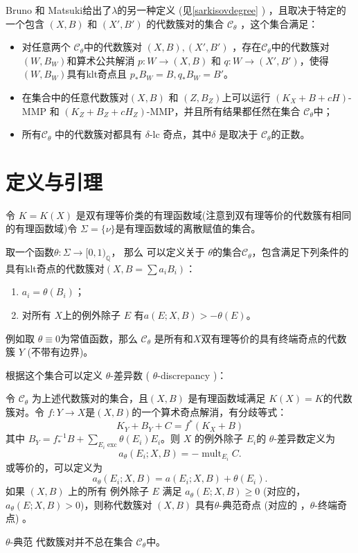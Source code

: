 Bruno 和 Matsuki给出了$\lambda$的另一种定义 (见\ref{sarkisovdegree} ) ，且取决于特定的一个包含 $(X,B)$ 和 $(X',B')$ 的代数簇对的集合 $\mathcal{C}_{\theta}$ ，这个集合满足：
\begin{itemize}
  \item
   对任意两个  $\mathcal{C}_{\theta}$中的代数簇对 $(X,B),(X',B')$ ，存在$\mathcal{C}_\theta$中的代数簇对 $(W,B_W)$和算术公共解消 $p:W\to (X,B)$ 和 $q:W\to (X',B')$，使得 $(W,B_W)$具有klt奇点且 $p_*B_W=B,q_*B_W=B'$。
  \item  在集合中的任意代数簇对$(X,B)$ 和 $(Z,B_Z)$上可以运行  $(K_X+B+cH)$-MMP 和 $(K_Z+B_Z+cH_Z)$-MMP，并且所有结果都任然在集合 $\mathcal{C}_{\theta}$中；
  \item 所有$\mathcal{C}_{\theta}$ 中的代数簇对都具有 $\delta$-lc 奇点，其中$\delta$ 是取决于 $\mathcal{C}_{\theta}$的正数。 
\end{itemize}

\section{定义与引理}
令 $ K=K(X) $ 是双有理等价类的有理函数域(注意到双有理等价的代数簇有相同的有理函数域)令 $ \Sigma=\{\nu\} $是有理函数域的离散赋值的集合。
\begin{definition}\label{thetacategory}
  \cite[Definition 3.5]{brunoLogSarkisovProgram1995}
  取一个函数$\theta:\Sigma\to [0,1)_{\mathbb{Q}}$， 那么 可以定义关于  $\theta$的集合$ \mathcal{C}_\theta $，包含满足下列条件的具有klt奇点的代数簇对$ (X,B=\sum a_{i}B_{i}) $：
  \begin{enumerate}
    \item $ a_i=\theta(B_i) $；
    \item 对所有 $ X $上的例外除子 $E $ 有$ a(E;X,B)>-\theta(E) $。
  \end{enumerate}
\end{definition}
\begin{remark}
例如取 $\theta \equiv 0$为常值函数，那么 $\mathcal{C}_{\theta}$ 是所有和$X$双有理等价的具有终端奇点的代数簇 $Y$ (不带有边界)。
\end{remark}
  根据这个集合可以定义 $\theta$-差异数 ( $\theta$-discrepancy )：
\begin{definition}
  令 $\mathcal{C}_{\theta}$ 为上述代数簇对的集合，且$(X, B)$ 是有理函数域满足 $K(X)=K$的代数簇对。令  $f: Y\to X$是$(X, B)$的一个算术奇点解消，有分歧等式：
  \[
    K_{Y}+B_{Y}+C=f^*(K_{X}+B)
  \]
  其中 $B_{Y}=f^{-1}_*B+ \sum_{E_{i}\text{ exc}} \theta(E_{i})E_{i}$。则 $X$ 的例外除子 $E_{i}$的 $\theta$-差异数定义为
  \[
    a_{\theta}(E_{i};X,B)=-\operatorname{mult}_{E_{i}}C.
  \]
  或等价的，可以定义为
  \[
    a_{\theta}(E_{i};X,B)=a(E_{i};X,B)+\theta(E_{i}).
  \]
  如果 $(X,B)$ 上的所有 例外除子 $E$ 满足   $a_{\theta}(E;X,B)\geqslant 0$ (对应的， $a_{\theta}(E;X,B)> 0$)，则称代数簇对 $(X,B)$ 具有$\theta$-典范奇点 (对应的 ，$\theta$-终端奇点)  。
\end{definition}
\begin{remark}
 $\theta$-典范 代数簇对并不总在集合 $\mathcal{C}_{\theta}$中。
\end{remark}

